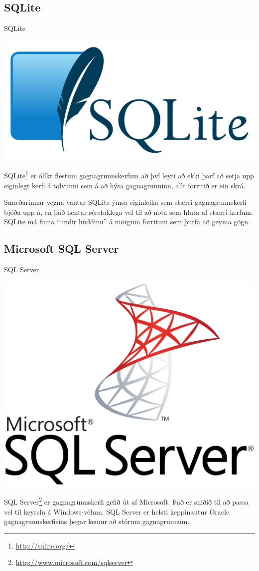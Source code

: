 \subsection{SQLite}
\begin{marginfigure}
\caption{SQLite}
\label{mynd:sqlite}
\centering
\includegraphics[width=\linewidth]{myndir/sqlite}
\end{marginfigure}
SQLite\footnote{\url{http://sqlite.org/}} er ólíkt flestum gagnagrunnskerfum að því leyti að ekki þarf að setja upp eiginlegt kerfi á tölvunni sem á að hýsa gagnagrunninn, allt forritið er ein skrá.

Smæðarinnar vegna vantar SQLite ýmsa eiginleika sem stærri gagnagrunnskerfi bjóða upp á, en það hentar sérstaklega vel til að nota sem hluta af stærri kerfum. SQLite má finna ``undir húddinu'' á mörgum forritum sem þurfa að geyma gögn.
\subsection{Microsoft SQL Server}
\begin{marginfigure}
\caption{SQL Server}
\label{mynd:sql-server}
\centering
\includegraphics[width=\linewidth]{myndir/sql-server}
\end{marginfigure}
SQL Server\footnote{\url{http://www.microsoft.com/sqlserver}} er gagnagrunnskerfi gefið út af Microsoft. Það er sniðið til að passa vel til keyrslu á Windows-vélum. SQL Server er helsti keppinautur Oracle gagnagrunnskerfisins þegar kemur að stórum gagnagrunnum.

